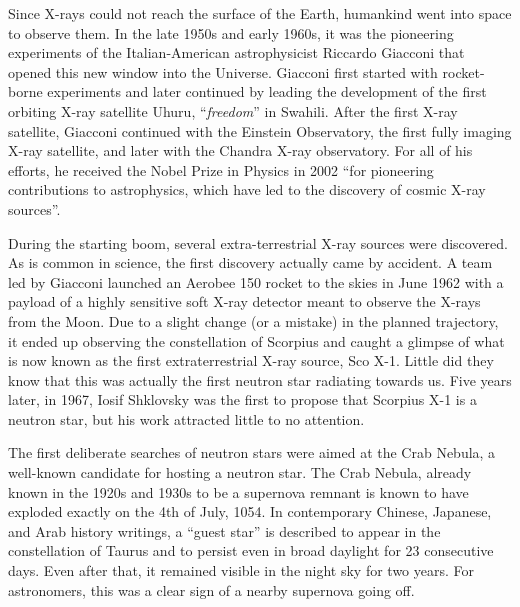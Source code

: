 Since X-rays could not reach the surface of the Earth, humankind went into space to observe them.
In the late 1950s and early 1960s, it was the pioneering experiments of the Italian-American astrophysicist Riccardo Giacconi that opened this new window into the Universe.
Giacconi first started with rocket-borne experiments and later continued by leading the development of the first orbiting X-ray satellite Uhuru, ``\textit{freedom}'' in Swahili.\cite{GGP62}
After the first X-ray satellite, Giacconi continued with the Einstein Observatory, the first fully imaging X-ray satellite, and later with the Chandra X-ray observatory.
For all of his efforts, he received the Nobel Prize in Physics in 2002 ``for pioneering contributions to astrophysics, which have led to the discovery of cosmic X-ray sources''.


During the starting boom, several extra-terrestrial X-ray sources were discovered.
As is common in science, the first discovery actually came by accident.
A team led by Giacconi launched an Aerobee 150 rocket to the skies in June 1962 with a payload of a highly sensitive soft X-ray detector meant to observe the X-rays from the Moon.
Due to a slight change (or a mistake) in the planned trajectory, it ended up observing the constellation of Scorpius and caught a glimpse of what is now known as the first extraterrestrial X-ray source, Sco X-1.
Little did they know that this was actually the first neutron star radiating towards us.
Five years later, in 1967, Iosif Shklovsky was the first to propose that Scorpius X-1 is a neutron star\cite{Shklovsky67}, but his work attracted little to no attention.

The first deliberate searches of neutron stars were aimed at the Crab Nebula, a well-known candidate for hosting a neutron star.
The Crab Nebula, already known in the 1920s and 1930s to be a supernova remnant is known to have exploded exactly on the 4th of July, 1054.\cite{Oort, Lundmark21, Mayall39, HistSupernovas}
In contemporary Chinese, Japanese, and Arab history writings, a ``guest star'' is described to appear in the constellation of Taurus and to persist even in broad daylight for 23 consecutive days.
Even after that, it remained visible in the night sky for two years.
For astronomers, this was a clear sign of a nearby supernova going off.


